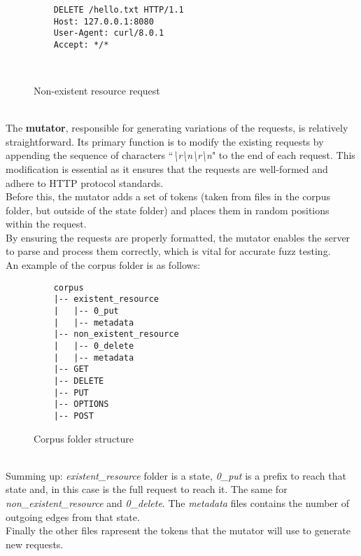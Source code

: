 \begin{figure}[H]
    \centering
    \begin{adjustbox}{valign=t}
    \begin{lstlisting}
    DELETE /hello.txt HTTP/1.1
    Host: 127.0.0.1:8080
    User-Agent: curl/8.0.1
    Accept: */*

    
    \end{lstlisting}
    \end{adjustbox}
    \caption{Non-existent resource request}
    \label{tab:nonexistent_resource}
\end{figure}
\phantom{}\\
The \textbf{mutator}, responsible for generating variations of the requests, is relatively straightforward. Its primary function is to modify the existing requests by appending the sequence of characters ``\textit{\textbackslash r\textbackslash n\textbackslash r\textbackslash n}" to the end of each request. This modification is essential as it ensures that the requests are well-formed and adhere to HTTP protocol standards.
\\Before this, the mutator adds a set of tokens (taken from files in the corpus folder, but outside of the state folder) and places them in random positions within the request.
\\By ensuring the requests are properly formatted, the mutator enables the server to parse and process them correctly, which is vital for accurate fuzz testing.
\\An example of the corpus folder is as follows:
\begin{figure}[H]
    \centering
    \begin{adjustbox}{valign=t}
    \begin{lstlisting}
    corpus
    |-- existent_resource
    |   |-- 0_put
    |   |-- metadata
    |-- non_existent_resource
    |   |-- 0_delete
    |   |-- metadata
    |-- GET
    |-- DELETE
    |-- PUT
    |-- OPTIONS
    |-- POST
    \end{lstlisting}
    \end{adjustbox}
    \caption{Corpus folder structure}
\end{figure}
\phantom{}\\
Summing up: \textit{existent\_resource} folder is a state, \textit{0\_put} is a prefix to reach that state and, in this case is the full request to reach it. The same for \textit{non\_existent\_resource} and \textit{0\_delete}. The \textit{metadata} files contains the number of outgoing edges from that state.
\\Finally the other files rapresent the tokens that the mutator will use to generate new requests.

